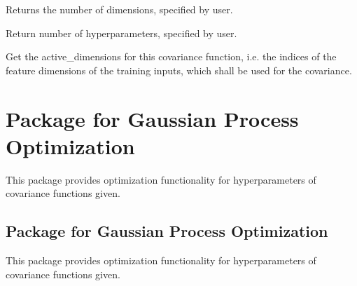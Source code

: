 \documentclass[letterpaper,10pt,english]{sphinxmanual}
\begin{document}
\begin{fulllineitems}
\begin{fulllineitems}
\label{covars:pygp.covar.CovarianceFunction.get_n_dimensions}
Returns the number of dimensions, specified by user.

\end{fulllineitems}


\begin{fulllineitems}
\label{covars:pygp.covar.CovarianceFunction.get_number_of_parameters}
Return number of hyperparameters, specified by user.

\end{fulllineitems}


\begin{fulllineitems}
\label{covars:pygp.covar.CovarianceFunction.set_dimension_indices}
Get the active\_dimensions for this covariance function, i.e.
the indices of the feature dimensions of the training inputs, which shall
be used for the covariance.

\end{fulllineitems}


\end{fulllineitems}

\label{opt_hyper:module-pygp.optimize}

\chapter{Package for Gaussian Process Optimization}
\label{opt_hyper:package-for-gaussian-process-optimization}\label{opt_hyper::doc}
This package provides optimization functionality
for hyperparameters of covariance functions
{\hyperref[covars:module-pygp.covar]{}} given.
\label{opt_hyper:module-pygp.optimize.optimize_base}

\section{Package for Gaussian Process Optimization}
\label{opt_hyper:id1}
This package provides optimization functionality
for hyperparameters of covariance functions
{\hyperref[covars:module-pygp.covar]{}} given.
\end{document}
